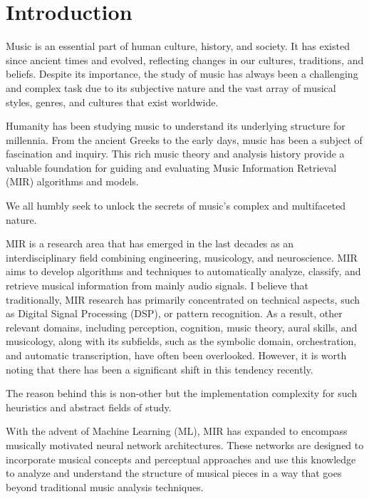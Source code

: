 \chapter{Introduction}

Music is an essential part of human culture, history, and society. It has existed since ancient times and evolved, reflecting changes in our cultures, traditions, and beliefs. Despite its importance, the study of music has always been a challenging and complex task due to its subjective nature and the vast array of musical styles, genres, and cultures that exist worldwide.

Humanity has been studying music to understand its underlying structure for millennia. From the ancient Greeks to the early days, music has been a subject of fascination and inquiry. This rich music theory and analysis history provide a valuable foundation for guiding and evaluating Music Information Retrieval (MIR) algorithms and models. 

We all humbly seek to unlock the secrets of music's complex and multifaceted nature.

MIR is a research area that has emerged in the last decades as an interdisciplinary field combining engineering, musicology, and neuroscience. MIR aims to develop algorithms and techniques to automatically analyze, classify, and retrieve musical information from mainly audio signals. I believe that traditionally, MIR research has primarily concentrated on technical aspects, such as Digital Signal Processing (DSP), or pattern recognition. As a result, other relevant domains, including perception, cognition, music theory, aural skills, and musicology, along with its subfields, such as the symbolic domain, orchestration, and automatic transcription, have often been overlooked. However, it is worth noting that there has been a significant shift in this tendency recently.

The reason behind this is non-other but the implementation complexity for such heuristics and abstract fields of study.

With the advent of Machine Learning (ML), MIR has expanded to encompass musically motivated neural network architectures\cite{musicmotivCNN}. These networks are designed to incorporate musical concepts and perceptual approaches and use this knowledge to analyze and understand the structure of musical pieces in a way that goes beyond traditional music analysis techniques.
